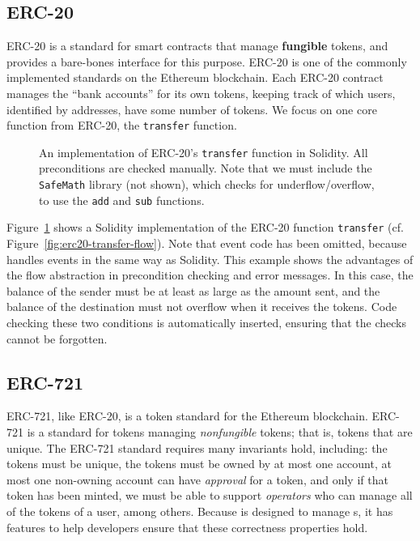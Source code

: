 \documentclass[dvipsnames, usenames, sigconf]{acmart}
\begin{document}
\subsection{ERC-20}\label{sec:erc20-impl}
ERC-20 is a standard for smart contracts that manage \textbf{fungible} tokens, and provides a bare-bones interface for this purpose.
ERC-20 is one of the commonly implemented standards on the Ethereum blockchain.
Each ERC-20 contract manages the ``bank accounts'' for its own tokens, keeping track of which users, identified by addresses, have some number of tokens.
We focus on one core function from ERC-20, the \lstinline{transfer} function.
\begin{figure}[ht]
    \centering
    
    \caption{An implementation of ERC-20's \lstinline{transfer} function in Solidity.
        All preconditions are checked manually.
        Note that we must include the \lstinline{SafeMath} library (not shown), which checks for underflow/overflow, to use the \lstinline{add} and \lstinline{sub} functions.}
    \label{fig:erc20-transfer-sol}
\end{figure}
Figure~\ref{fig:erc20-transfer-sol} shows a Solidity implementation of the ERC-20 function \lstinline{transfer} (cf. Figure~\ref{fig:erc20-transfer-flow}).
Note that event code has been omitted, because \langName handles events in the same way as Solidity.
This example shows the advantages of the flow abstraction in precondition checking and error messages. 
In this case, the balance of the sender must be at least as large as the amount sent, and the balance of the destination must not overflow when it receives the tokens.
Code checking these two conditions is automatically inserted, ensuring that the checks cannot be forgotten.

\subsection{ERC-721}\label{sec:erc721-impl}

ERC-721, like ERC-20, is a token standard for the Ethereum blockchain.
ERC-721 is a standard for tokens managing \emph{nonfungible} tokens; that is, tokens that are unique.
The ERC-721 standard requires many invariants hold, including:
    the tokens must be unique,
    the tokens must be owned by at most one account,
    at most one non-owning account can have \emph{approval} for a token, and only if that token has been minted,
    we must be able to support \emph{operators} who can manage all of the tokens of a user,
    among others.
Because \langName is designed to manage \assetTxt{}s, it has features to help developers ensure that these correctness properties hold.
\end{document}
